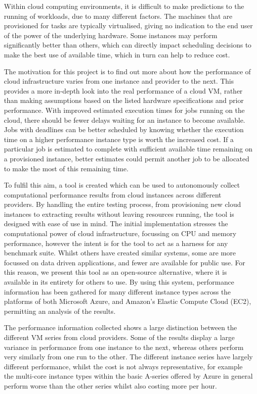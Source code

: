 \documentclass{llncs}
\begin{document}
Within cloud computing environments, it is difficult to make predictions to the running of workloads, due to many different factors. The machines that are provisioned for tasks are typically virtualised, giving no indication to the end user of the power of the underlying hardware. Some instances may perform significantly better than others, which can directly impact scheduling decisions to make the best use of available time, which in turn can help to reduce cost.

The motivation for this project is to find out more about how the performance of cloud infrastructure varies from one instance and provider to the next. This provides a more in-depth look into the real performance of a cloud VM, rather than making assumptions based on the listed hardware specifications and prior performance. With improved estimated execution times for jobs running on the cloud, there should be fewer delays waiting for an instance to become available. Jobs with deadlines can be better scheduled by knowing whether the execution time on a higher performance instance type is worth the increased cost. If a particular job is estimated to complete with sufficient available time remaining on a provisioned instance, better estimates could permit another job to be allocated to make the most of this remaining time.

To fulfil this aim, a tool is created which can be used to autonomously collect computational performance results from cloud instances across different providers. By handling the entire testing process, from provisioning new cloud instances to extracting results without leaving resources running, the tool is designed with ease of use in mind. The initial implementation stresses the computational power of cloud infrastructure, focussing on CPU and memory performance, however the intent is for the tool to act as a harness for any benchmark suite. Whilst others have created similar systems, some are more focussed on data driven applications, and fewer are available for public use. For this reason, we present this tool as an open-source alternative, where it is available in its entirety for others to use. By using this system, performance information has been gathered for many different instance types across the platforms of both Microsoft Azure, and Amazon's Elastic Compute Cloud (EC2), permitting an analysis of the results.

The performance information collected shows a large distinction between the different VM series from cloud providers. Some of the results display a large variance in performance from one instance to the next, whereas others perform very similarly from one run to the other. The different instance series have largely different performance, whilst the cost is not always representative, for example the multi-core instance types within the basic A-series offered by Azure in general perform worse than the other series whilst also costing more per hour.
\end{document}

